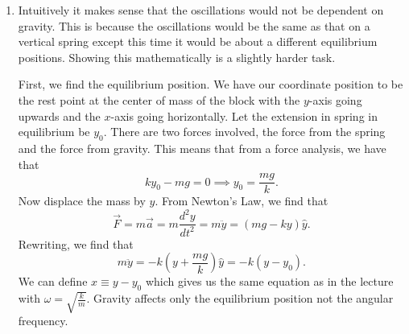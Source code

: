 \begin{sol}
\begin{enumerate}[label=\textbf{(\alph*)}]
    \item Intuitively it makes sense that the oscillations would not be dependent on gravity. This is because the oscillations would be the same as that on a vertical spring except this time it would be about a different equilibrium positions. Showing this mathematically is a slightly harder task. 
    \vspace{3mm}
    
    \noindent First, we find the equilibrium position. We have our coordinate position to be the rest point at the center of mass of the block with the $y$-axis going upwards and the $x$-axis going horizontally. Let the extension in spring in equilibrium be $y_0$. There are two forces involved, the force from the spring and the force from gravity. This means that from a force analysis, we have that 
    \[ky_0 - mg = 0 \implies y_0 = \frac{mg}{k}.\]
    Now displace the mass by $y$. From Newton's Law, we find that
    $$\vec{F} = m\vec{a} = m\frac{d^2 y}{dt^2} = m \ddot {y} = (mg - ky)\hat{y}.$$
    Rewriting, we find that 
    \[m\ddot{y} = -k\left(y + \frac{mg}{k}\right)\hat{y} = -k (y - y_0).\]
    We can define $x\equiv y - y_0$ which gives us the same equation as in the lecture with $\omega = \sqrt {\frac{k}{m}}$. Gravity affects only the equilibrium position not the angular frequency.
\end{enumerate}

\end{sol}